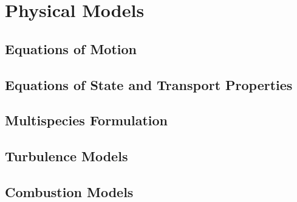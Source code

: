\section{Physical Models}

\subsection{Equations of Motion}

\subsection{Equations of State and Transport Properties}

\subsection{Multispecies Formulation}

\subsection{Turbulence Models}

\subsection{Combustion Models}